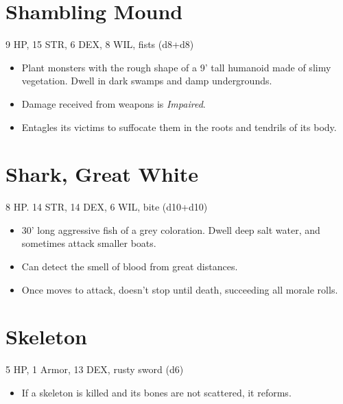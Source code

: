 \documentclass[
  10pt,
  american,
]{article}
\begin{document}
\hypertarget{shambling-mound}{%
\section{Shambling Mound}\label{shambling-mound}}

9 HP, 15 STR, 6 DEX, 8 WIL, fists (d8+d8)

\begin{samepage}
\begin{itemize}
\setlength\itemsep{-.5em}
\item Plant monsters with the rough shape of a 9' tall humanoid made of slimy vegetation. Dwell in dark swamps and damp undergrounds.
\item Damage received from weapons is \emph{Impaired}.
\item Entagles its victims to suffocate them in the roots and tendrils of its body.
\end{itemize}
\end{samepage}

\hypertarget{shark-great-white}{%
\section{Shark, Great White}\label{shark-great-white}}

8 HP. 14 STR, 14 DEX, 6 WIL, bite (d10+d10)

\begin{samepage}
\begin{itemize}
\setlength\itemsep{-.5em}
\item 30' long aggressive fish of a grey coloration. Dwell deep salt water, and sometimes attack smaller boats.
\item Can detect the smell of blood from great distances.
\item Once moves to attack, doesn't stop until death, succeeding all morale rolls.
\end{itemize}
\end{samepage}

\hypertarget{skeleton}{%
\section{Skeleton}\label{skeleton}}

5 HP, 1 Armor, 13 DEX, rusty sword (d6)

\begin{samepage}
\begin{itemize}
\setlength\itemsep{-.5em}
\item If a skeleton is killed and its bones are not scattered, it reforms.
\end{itemize}
\end{samepage}
\end{document}
